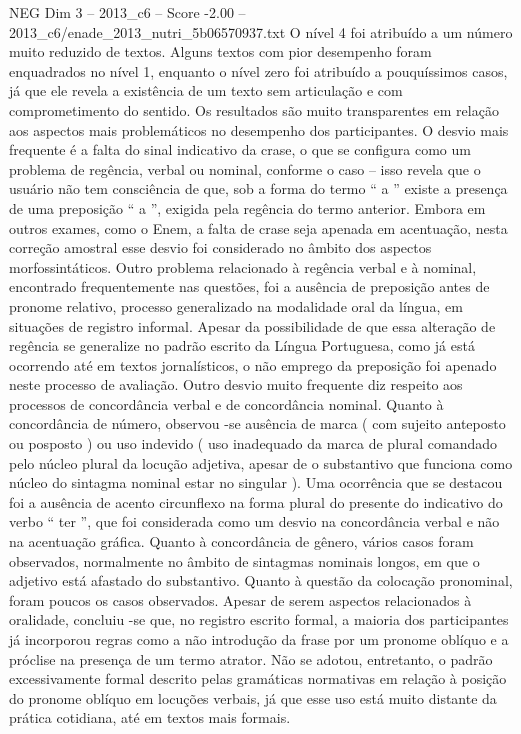 \begin{textsample}{NEG Dim 3 – 2013\_c6 – Score -2.00 – 2013\_c6/enade\_2013\_nutri\_5b06570937.txt}
O nível 4 foi atribuído a um número muito reduzido de textos.
Alguns textos com pior desempenho foram enquadrados no nível 1, enquanto o nível zero foi atribuído a pouquíssimos casos, já que ele revela a existência de um texto sem articulação e com comprometimento do sentido.
Os resultados são muito transparentes em relação aos aspectos mais problemáticos no desempenho dos participantes.
O desvio mais frequente é a falta do sinal indicativo da crase, o que se configura como um problema de regência, verbal ou nominal, conforme o caso – isso revela que o usuário não tem consciência de que, sob a forma do termo “ a ” existe a presença de uma preposição “ a ”, exigida pela regência do termo anterior.
Embora em outros exames, como o Enem, a falta de crase seja apenada em acentuação, nesta correção amostral esse desvio foi considerado no âmbito dos aspectos morfossintáticos.
Outro problema relacionado à regência verbal e à nominal, encontrado frequentemente nas questões, foi a ausência de preposição antes de pronome relativo, processo generalizado na modalidade oral da língua, em situações de registro informal.
Apesar da possibilidade de que essa alteração de regência se generalize no padrão escrito da Língua Portuguesa, como já está ocorrendo até em textos jornalísticos, o não emprego da preposição foi apenado neste processo de avaliação.
Outro desvio muito frequente diz respeito aos processos de concordância verbal e de concordância nominal.
Quanto à concordância de número, observou -se ausência de marca ( com sujeito anteposto ou posposto ) ou uso indevido ( uso inadequado da marca de plural comandado pelo núcleo plural da locução adjetiva, apesar de o substantivo que funciona como núcleo do sintagma nominal estar no singular ).
Uma ocorrência que se destacou foi a ausência de acento circunflexo na forma plural do presente do indicativo do verbo “ ter ”, que foi considerada como um desvio na concordância verbal e não na acentuação gráfica.
Quanto à concordância de gênero, vários casos foram observados, normalmente no âmbito de sintagmas nominais longos, em que o adjetivo está afastado do substantivo.
Quanto à questão da colocação pronominal, foram poucos os casos observados.
Apesar de serem aspectos relacionados à oralidade, concluiu -se que, no registro escrito formal, a maioria dos participantes já incorporou regras como a não introdução da frase por um pronome oblíquo e a próclise na presença de um termo atrator.
Não se adotou, entretanto, o padrão excessivamente formal descrito pelas gramáticas normativas em relação à posição do pronome oblíquo em locuções verbais, já que esse uso está muito distante da prática cotidiana, até em textos mais formais.

\end{textsample}
